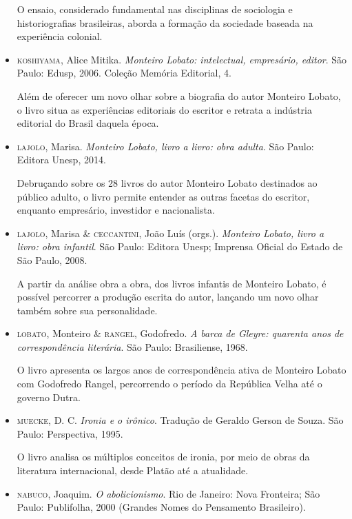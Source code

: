 \documentclass[11pt]{extarticle}
\begin{document}
\begin{itemize}
O ensaio, considerado fundamental nas disciplinas de sociologia e historiografias 
brasileiras, aborda a formação da sociedade baseada na experiência colonial.

\item \textsc{koshiyama}, Alice Mitika. \emph{Monteiro Lobato: intelectual, empresário,
editor}. São Paulo: Edusp, 2006. Coleção Memória Editorial, 4.

Além de oferecer um novo olhar sobre a biografia do autor Monteiro Lobato, o livro 
situa as experiências editoriais do escritor e retrata a indústria editorial do 
Brasil daquela época.

\item \textsc{lajolo}, Marisa. \emph{Monteiro Lobato, livro a livro: obra adulta}. São
Paulo: Editora Unesp, 2014.

Debruçando sobre os 28 livros do autor Monteiro Lobato destinados ao público adulto, o livro 
permite entender as outras facetas do escritor, enquanto empresário, investidor e nacionalista.

\item \textsc{lajolo}, Marisa \& \textsc{ceccantini}, João Luís (orgs.). \emph{Monteiro Lobato,
livro a livro: obra infantil}. São Paulo: Editora Unesp; Imprensa
Oficial do Estado de São Paulo, 2008.

A partir da análise obra a obra, dos livros infantis de Monteiro Lobato, é possível 
percorrer a produção escrita do autor, lançando um novo olhar também sobre sua 
personalidade.

\item \textsc{lobato}, Monteiro \& \textsc{rangel}, Godofredo. \emph{A barca de Gleyre: quarenta
anos de correspondência literária}. São Paulo: Brasiliense, 1968.

O livro apresenta os largos anos de correspondência ativa de Monteiro Lobato com Godofredo 
Rangel, percorrendo o período da República Velha até o governo Dutra.

\item \textsc{muecke}, D. C. \emph{Ironia e o irônico}. Tradução de Geraldo Gerson de
Souza. São Paulo: Perspectiva, 1995.

O livro analisa os múltiplos conceitos de ironia, por meio de obras da literatura 
internacional, desde Platão até a atualidade.

\item \textsc{nabuco}, Joaquim. \emph{O abolicionismo}. Rio de Janeiro: Nova Fronteira;
São Paulo: Publifolha, 2000 (Grandes Nomes do Pensamento Brasileiro).


\end{itemize}
\end{document}
